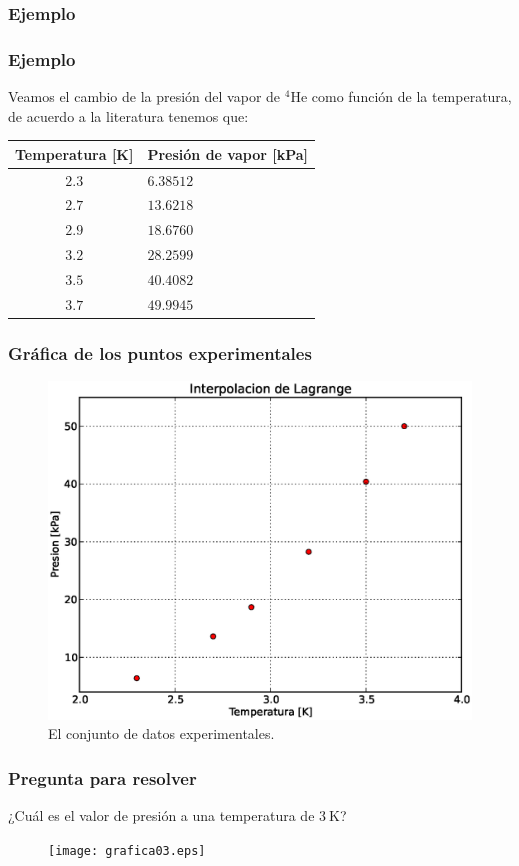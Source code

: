 \subsubsection{Ejemplo}
\begin{frame}
\frametitle{Ejemplo}
Veamos el cambio de la presión del vapor de {}$^{4}$He como función de la temperatura, de acuerdo a la literatura tenemos que:
\fontsize{12}{12}\selectfont
\begin{center}
\begin{tabular}{c | l@{}}
Temperatura [K] & Presión de vapor [kPa] \\
\hline $2.3$ & $6.38512$ \\
\hline $2.7$ & $13.6218$ \\
\hline $2.9$ & $18.6760$ \\
\hline $3.2$ & $28.2599$ \\
\hline $3.5$ & $40.4082$ \\
\hline $3.7$ & $49.9945$
\end{tabular}
\end{center}
\end{frame}
\begin{frame}
\frametitle{Gráfica de los puntos experimentales}
\begin{figure}
	\centering
	\includegraphics[scale=0.4]{Imagenes/grafica03_1.eps}
	\caption{El conjunto de datos experimentales.}
\end{figure}
\end{frame}
\begin{frame}
\frametitle{Pregunta para resolver}
¿Cuál es el valor de presión a una temperatura de $\SI{3}{\kelvin}$?
\begin{figure}
	\centering
	\texttt{[image: grafica03.eps]} 
\end{figure}
\end{frame}

